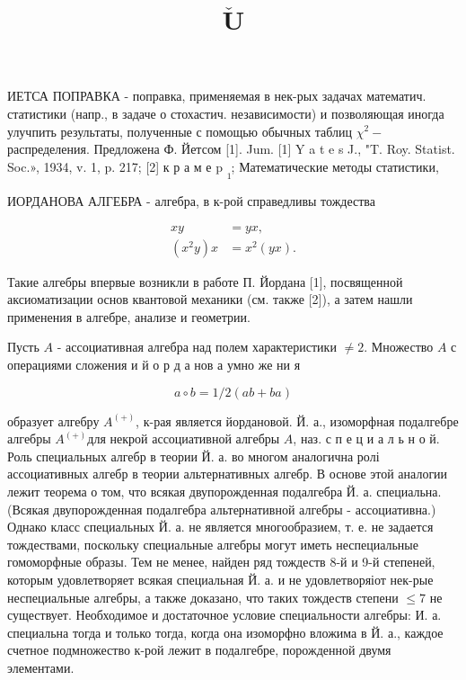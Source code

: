 \documentclass[10pt]{article}
\title{$\check{\mathbf{U}}$ }
\author{}
\date{}
\begin{document}
\maketitle

ИЕТСА ПОПРАВКА - поправка, применяемая в нек-рых задачах математич. статистики (напр., в задаче о стохастич. независимости) и позволяющая иногда улучпить результаты, полученные с помощью обычных таблиц $\chi^{2}-$ распределения. Предложена Ф. Йетсом [1]. Jum. [1] Y a t e s J., "T. Roy. Statist. Soc.», 1934, v. 1, p. 217; [2] к р а м е p $\underset{1}{ }$; Математические методы статистики,



ИОРДАНОВА АЛГЕБРА - алгебра, в к-рой справедливы тождества



\[

\begin{aligned}

x y & =y x, \\

\left(x^{2} y\right) x & =x^{2}(y x) .

\end{aligned}

\]



Такие алгебры впервые возникли в работе П. Йордана [1], посвященной аксиоматизации основ квантовой механики (см. также [2]), а затем нашли применения в алгебре, анализе и геометрии.



Пусть $A$ - ассоциативная алгебра над полем характеристики $\neq 2$. Множество $A$ с операциями сложения и й о р д а нов а умно же ни я



\[

a \circ b=1 / 2(a b+b a)

\]



образует алгебру $A^{(+)}$, к-рая является йордановой. Й. а., изоморфная подалгебре алгебры $A^{(+)}$для некрой ассоциативной алгебры $A$, наз. с п е ц и а л ь н о й. Роль специальных алгебр в теории Й. а. во многом аналогична ролі ассоциативных алгебр в теории альтернативных алгебр. В основе этой аналогии лежит теорема о том, что всякая двупорожденная подалгебра Й. а. специальна. (Всякая двупорожденная подалгебра альтернативной алгебры - ассоциативна.) Однако класс специальных Й. а. не является многообразием, т. е. не задается тождествами, поскольку специальные алгебры могут иметь неспециальные гомоморфные образы. Тем не менее, найден ряд тождеств 8-й и 9-й степеней, которым удовлетворяет всякая специальная Й. а. и не удовлетворяіот нек-рые неспециальные алгебры, а также доказано, что таких тождеств степени $\leqslant 7$ не существует. Необходимое и достаточное условие специальности алгебры: И. а. специальна тогда и только тогда, когда она изоморфно вложима в Й. а., каждое счетное подмножество к-рой лежит в подалгебре, порожденной двумя элементами.
\end{document}
